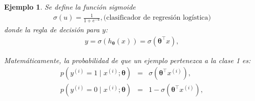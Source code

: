 \documentclass[12pt]{article}
\newtheorem{Ejem}{Ejemplo}%
\begin{document}
\begin{Ejem}
Se define la función sigmoide
\begin{eqnarray*}
\sigma(u) = \frac{1}{1 + e^{-u}}, \text{(clasificador de regresión logística)}
\end{eqnarray*}
donde la regla de decisión para $y$:
\begin{eqnarray*}
y = \sigma(h_{\boldsymbol{\theta}}(x)) = \sigma(\boldsymbol{\theta}^{\top} x),
\end{eqnarray*}

Matemáticamente, la probabilidad de que un ejemplo pertenezca a la clase 1 es:
\begin{eqnarray*}
p\left(y^{(i)} = 1 \mid x^{(i)}; \boldsymbol{\theta} \right) &=& \sigma(\boldsymbol{\theta}^{\top} x^{(i)}),\\
p\left(y^{(i)} = 0 \mid x^{(i)}; \boldsymbol{\theta} \right) &=& 1 - \sigma(\boldsymbol{\theta}^{\top} x^{(i)}),
\end{eqnarray*}


\end{Ejem}
\end{document}
